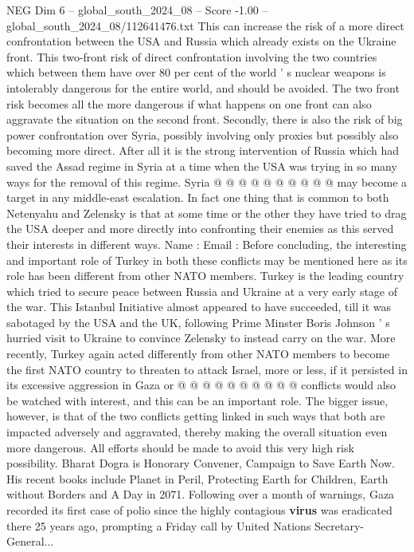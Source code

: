 \begin{textsample}{NEG Dim 6 – global\_south\_2024\_08 – Score -1.00 – global\_south\_2024\_08/112641476.txt}
This can increase the risk of a more direct confrontation between the USA and Russia which already exists on the Ukraine front.
This two-front risk of direct confrontation involving the two countries which between them have over 80 per cent of the world ' s nuclear weapons is intolerably dangerous for the entire world, and should be avoided.
The two front risk becomes all the more dangerous if what happens on one front can also aggravate the situation on the second front.
Secondly, there is also the risk of big power confrontation over Syria, possibly involving only proxies but possibly also becoming more direct.
After all it is the strong intervention of Russia which had saved the Assad regime in Syria at a time when the USA was trying in so many ways for the removal of this regime.
Syria @ @ @ @ @ @ @ @ @ @ may become a target in any middle-east escalation.
In fact one thing that is common to both Netenyahu and Zelensky is that at some time or the other they have tried to drag the USA deeper and more directly into confronting their enemies as this served their interests in different ways.
Name : Email : Before concluding, the interesting and important role of Turkey in both these conflicts may be mentioned here as its role has been different from other NATO members.
Turkey is the leading country which tried to secure peace between Russia and Ukraine at a very early stage of the war.
This Istanbul Initiative almost appeared to have succeeded, till it was sabotaged by the USA and the UK, following Prime Minster Boris Johnson ' s hurried visit to Ukraine to convince Zelensky to instead carry on the war.
More recently, Turkey again acted differently from other NATO members to become the first NATO country to threaten to attack Israel, more or less, if it persisted in its excessive aggression in Gaza or @ @ @ @ @ @ @ @ @ @ conflicts would also be watched with interest, and this can be an important role.
The bigger issue, however, is that of the two conflicts getting linked in such ways that both are impacted adversely and aggravated, thereby making the overall situation even more dangerous.
All efforts should be made to avoid this very high risk possibility.
Bharat Dogra is Honorary Convener, Campaign to Save Earth Now.
His recent books include Planet in Peril, Protecting Earth for Children, Earth without Borders and A Day in 2071.
Following over a month of warnings, Gaza recorded its first case of polio since the highly contagious \textbf{virus} was eradicated there 25 years ago, prompting a Friday call by United Nations Secretary-General...

\end{textsample}
